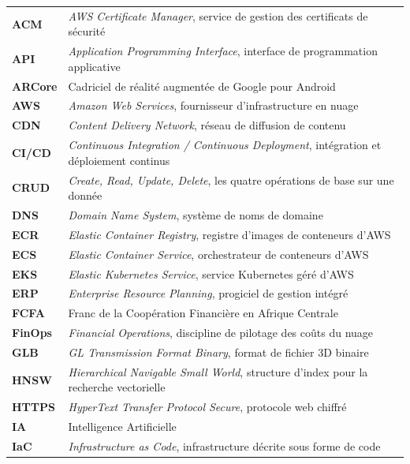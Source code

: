 \begingroup
{}
\small
\begin{longtable}{@{}L{2.6cm}@{\hspace{0.6em}}L{11.6cm}@{}}
\textbf{ACM}      & \emph{AWS Certificate Manager}, service de gestion des certificats de sécurité \\
\textbf{API}      & \emph{Application Programming Interface}, interface de programmation applicative \\
\textbf{ARCore}   & Cadriciel de réalité augmentée de Google pour Android \\
\textbf{AWS}      & \emph{Amazon Web Services}, fournisseur d'infrastructure en nuage \\
\textbf{CDN}      & \emph{Content Delivery Network}, réseau de diffusion de contenu \\
\textbf{CI/CD}    & \emph{Continuous Integration / Continuous Deployment}, intégration et déploiement continus \\
\textbf{CRUD}     & \emph{Create, Read, Update, Delete}, les quatre opérations de base sur une donnée \\
\textbf{DNS}      & \emph{Domain Name System}, système de noms de domaine \\
\textbf{ECR}      & \emph{Elastic Container Registry}, registre d'images de conteneurs d'AWS \\
\textbf{ECS}      & \emph{Elastic Container Service}, orchestrateur de conteneurs d'AWS \\
\textbf{EKS}      & \emph{Elastic Kubernetes Service}, service Kubernetes géré d'AWS \\
\textbf{ERP}      & \emph{Enterprise Resource Planning}, progiciel de gestion intégré \\
\textbf{FCFA}     & Franc de la Coopération Financière en Afrique Centrale \\
\textbf{FinOps}   & \emph{Financial Operations}, discipline de pilotage des coûts du nuage \\
\textbf{GLB}      & \emph{GL Transmission Format Binary}, format de fichier 3D binaire \\
\textbf{HNSW}     & \emph{Hierarchical Navigable Small World}, structure d'index pour la recherche vectorielle \\
\textbf{HTTPS}    & \emph{HyperText Transfer Protocol Secure}, protocole web chiffré \\
\textbf{IA}       & Intelligence Artificielle \\
\textbf{IaC}      & \emph{Infrastructure as Code}, infrastructure décrite sous forme de code \\

\end{longtable}
